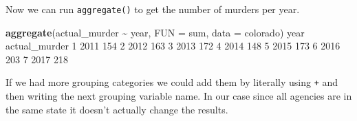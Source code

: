 \documentclass[
  12pt,
]{book}
\newenvironment{Shaded}{\begin{snugshade}}{\end{snugshade}}
\newcommand{\DataTypeTok}[1]{\textcolor[rgb]{0.27,0.27,0.27}{#1}}
\newcommand{\DecValTok}[1]{\textcolor[rgb]{0.06,0.06,0.06}{#1}}
\newcommand{\KeywordTok}[1]{\textcolor[rgb]{0.27,0.27,0.27}{\textbf{#1}}}
\newcommand{\NormalTok}[1]{#1}
\newcommand{\OperatorTok}[1]{\textcolor[rgb]{0.43,0.43,0.43}{\textbf{#1}}}
\newcommand{\StringTok}[1]{\textcolor[rgb]{0.5,0.5,0.5}{#1}}
\begin{document}
\begin{Shaded}
\end{Shaded}

Now we can run \texttt{aggregate()} to get the number of murders per year.

\begin{Shaded}
\begin{Highlighting}[]
\KeywordTok{aggregate}\NormalTok{(actual\_murder }\OperatorTok{\textasciitilde{}}\StringTok{ }\NormalTok{year, }\DataTypeTok{FUN =}\NormalTok{ sum, }\DataTypeTok{data =}\NormalTok{ colorado)}
\NormalTok{  year actual\_murder}
\DecValTok{1} \DecValTok{2011}           \DecValTok{154}
\DecValTok{2} \DecValTok{2012}           \DecValTok{163}
\DecValTok{3} \DecValTok{2013}           \DecValTok{172}
\DecValTok{4} \DecValTok{2014}           \DecValTok{148}
\DecValTok{5} \DecValTok{2015}           \DecValTok{173}
\DecValTok{6} \DecValTok{2016}           \DecValTok{203}
\DecValTok{7} \DecValTok{2017}           \DecValTok{218}
\end{Highlighting}
\end{Shaded}

If we had more grouping categories we could add them by literally using \texttt{+} and then writing the next grouping variable name. In our case since all agencies are in the same state it doesn't actually change the results.
\end{document}
